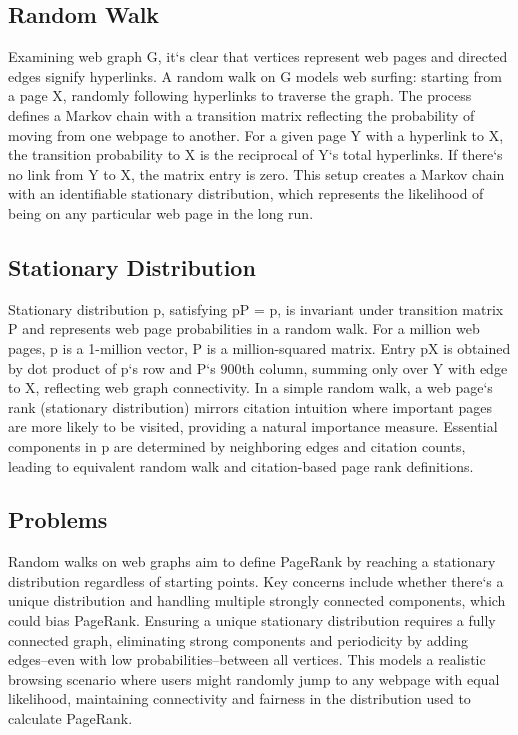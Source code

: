 \subsection*{Random Walk}
Examining web graph G, it`s clear that vertices represent web pages and directed edges signify hyperlinks.
A random walk on G models web surfing: starting from a page X, randomly following hyperlinks to traverse the graph.
The process defines a Markov chain with a transition matrix reflecting the probability of moving from one webpage to another.
For a given page Y with a hyperlink to X, the transition probability to X is the reciprocal of Y`s total hyperlinks.
If there`s no link from Y to X, the matrix entry is zero.
This setup creates a Markov chain with an identifiable stationary distribution, which represents the likelihood of being on any particular web page in the long run.

\subsection*{Stationary Distribution}
Stationary distribution p, satisfying pP = p, is invariant under transition matrix P and represents web page probabilities in a random walk.
For a million web pages, p is a 1-million vector, P is a million-squared matrix.
Entry pX is obtained by dot product of p`s row and P`s 900th column, summing only over Y with edge to X, reflecting web graph connectivity.
In a simple random walk, a web page`s rank (stationary distribution) mirrors citation intuition where important pages are more likely to be visited, providing a natural importance measure.
Essential components in p are determined by neighboring edges and citation counts, leading to equivalent random walk and citation-based page rank definitions.

\subsection*{Problems}
Random walks on web graphs aim to define PageRank by reaching a stationary distribution regardless of starting points.
Key concerns include whether there`s a unique distribution and handling multiple strongly connected components, which could bias PageRank.
Ensuring a unique stationary distribution requires a fully connected graph, eliminating strong components and periodicity by adding edges--even with low probabilities--between all vertices.
This models a realistic browsing scenario where users might randomly jump to any webpage with equal likelihood, maintaining connectivity and fairness in the distribution used to calculate PageRank.

